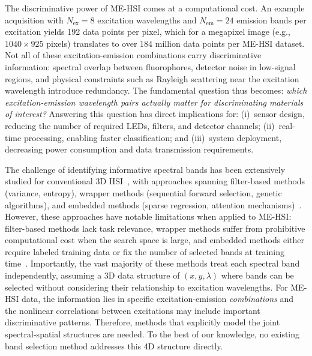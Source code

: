 The discriminative power of ME-HSI comes at a computational cost.
An example acquisition with $N_{\text{ex}} = 8$ excitation wavelengths and $N_{\text{em}} = 24$ emission bands per excitation yields 192 data points per pixel, which for a megapixel image (e.g., $1040 \times 925$ pixels) translates to over 184 million data points per ME-HSI dataset.
Not all of these excitation-emission combinations carry discriminative information: spectral overlap between fluorophores, detector noise in low-signal regions, and physical constraints such as Rayleigh scattering near the excitation wavelength introduce redundancy.
The fundamental question thus becomes: \emph{which excitation-emission wavelength pairs actually matter for discriminating materials of interest?}
Answering this question has direct implications for:
(i)~sensor design, reducing the number of required LEDs, filters, and detector channels;
(ii)~real-time processing, enabling faster classification; and
(iii)~system deployment, decreasing power consumption and data transmission requirements.

The challenge of identifying informative spectral bands has been extensively studied for conventional 3D HSI~\cite{sun2019hyperspectral,sawant2021survey,rasti2020featureextraction,ahmad2022survey,jia2020survey,asfour2018,guan2018}, with approaches spanning filter-based methods (variance, entropy), wrapper methods (sequential forward selection, genetic algorithms), and embedded methods (sparse regression, attention mechanisms)~\cite{martinez2006comparison,chang2000constrained,pudil1994floating,pal2010feature,tibshirani1996regression,lorenzo2020attention,cai2020bsnets}.
However, these approaches have notable limitations when applied to ME-HSI: filter-based methods lack task relevance, wrapper methods suffer from prohibitive computational cost when the search space is large, and embedded methods either require labeled training data or fix the number of selected bands at training time~\cite{balin2019concrete,cai2020bsnets}.
Importantly, the vast majority of these methods treat each spectral band independently, assuming a 3D data structure of $(x, y, \lambda)$ where bands can be selected without considering their relationship to excitation wavelengths.
For ME-HSI data, the information lies in specific excitation-emission \emph{combinations} and the nonlinear correlations between excitations may include important discriminative patterns.
Therefore, methods that explicitly model the joint spectral-spatial structures are needed.
To the best of our knowledge, no existing band selection method addresses this 4D structure directly.

